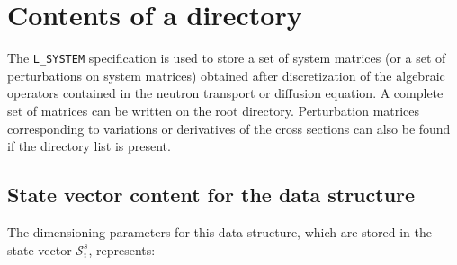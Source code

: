 \section{Contents of a  directory}\label{sect:systemdir}

The {\tt L\_SYSTEM} specification is used to store a set of system matrices (or a set of
perturbations on system matrices) obtained after discretization of the algebraic operators
contained in the neutron transport or diffusion equation. A complete set of matrices can
be written on the root directory. Perturbation matrices corresponding to variations or
derivatives of the cross sections can also be found if the  directory list
is present.

\subsection{State vector content for the  data structure}\label{sect:systemstate}

The dimensioning parameters for this data structure, which are stored in the state vector $\mathcal{S}^{s}_{i}$, represents:

